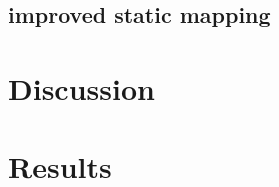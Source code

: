\documentclass{beamer}
\begin{document}
\subsection{improved static mapping}




\section{Discussion}



\section{Results}



\end{document}
